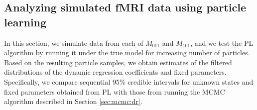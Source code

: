 %
%

\subsection{Analyzing simulated fMRI data using particle learning \label{sec:fmri:sim}}

In this section, we simulate data from each of $M_{011}$ and $M_{101}$, and we test the PL algorithm by running it under the true model for increasing number of particles. Based on the resulting particle samples, we obtain estimates of the filtered distributions of the dynamic regression coefficients and fixed parameters. Specifically, we compare sequential 95\% credible intervals for unknown states and fixed parameters obtained from PL with those from running the MCMC algorithm described in Section \ref{sec:mcmc:dr}.

